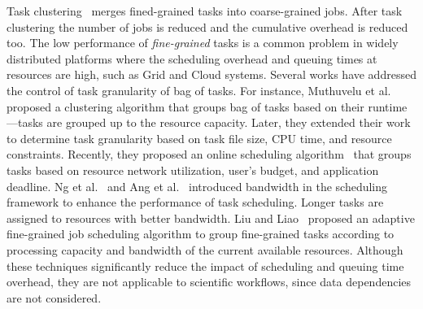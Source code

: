 



Task clustering~\cite{Ostberg2011, Chen2012, Maheshwari2012, Ferreira-granularity-2013} merges fined-grained tasks into coarse-grained jobs. After task clustering the number of jobs is reduced and the cumulative overhead is reduced too.
The low performance of \emph{fine-grained} tasks is a common problem in widely distributed platforms where the scheduling overhead and queuing times at resources are high, such as Grid and Cloud systems. Several works have addressed the control of task granularity of bag of tasks. For instance, Muthuvelu et al.~\cite{Muthuvelu:2005:DJG:1082290.1082297} proposed a clustering algorithm that groups bag of tasks based on their runtime---tasks are grouped up to the resource capacity. Later, they extended their work~\cite{4493929} to determine task granularity based on task file size, CPU time, and resource constraints. Recently, they proposed an online scheduling algorithm~\cite{Muthuvelu2010,Muthuvelu2013170} that groups tasks based on resource network utilization, user's budget, and application deadline. Ng et al.~\cite{keat-2006} and Ang et al.~\cite{ang-2009} introduced bandwidth in the scheduling framework to enhance the performance of task scheduling. Longer tasks are assigned to resources with better bandwidth. Liu and Liao~\cite{4958835} proposed an adaptive fine-grained job scheduling algorithm to group fine-grained tasks according to processing capacity and bandwidth of the current available resources. Although these techniques significantly reduce the impact of scheduling and queuing time overhead, they are not applicable to scientific workflows, since data dependencies are not considered.


